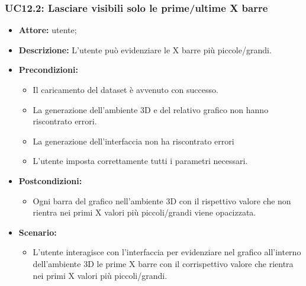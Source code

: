 \subsubsection{UC12.2: Lasciare visibili solo le prime/ultime X barre}
\begin{itemize}    
    \item \textbf{Attore:} utente;
    \item \textbf{Descrizione:} L'utente può evidenziare le X barre più piccole/grandi.
    \item \textbf{Precondizioni:}    
        \begin{itemize}
            \item Il caricamento del dataset è avvenuto con successo.
            \item La generazione dell'ambiente 3D e del relativo grafico non hanno riscontrato errori.
            \item La generazione dell'interfaccia non ha riscontrato errori
            \item L'utente imposta correttamente tutti i parametri necessari.
        \end{itemize}    
    \item \textbf{Postcondizioni:}
        \begin{itemize}
            \item Ogni barra del grafico nell'ambiente 3D con il rispettivo valore che non rientra nei primi X valori più piccoli/grandi viene opacizzata.
        \end{itemize}    
    \item \textbf{Scenario:} 
        \begin{itemize}
            \item L'utente interagisce con l'interfaccia per evidenziare nel grafico all'interno dell'ambiente 3D le prime X barre con il corrispettivo valore che rientra nei primi X valori più piccoli/grandi.
        \end{itemize}
\end{itemize}